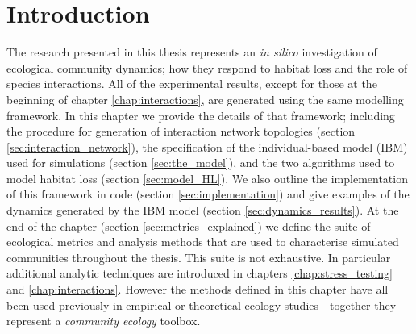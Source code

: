 

\section{Introduction}
\label{sec:methods_intro}
The research presented in this thesis represents an \emph{in silico} investigation of ecological community dynamics; how they respond to habitat loss and the role of species interactions. All of the experimental results, except for those at the beginning of chapter \ref{chap:interactions}, are generated using the same modelling framework. In this chapter we provide the details of that framework; including the procedure for generation of interaction network topologies (section \ref{sec:interaction_network}), the specification of the individual-based model (IBM) used for simulations (section \ref{sec:the_model}), and the two algorithms used to model habitat loss (section \ref{sec:model_HL}). We also outline the implementation of this framework in code (section \ref{sec:implementation}) and give examples of the dynamics generated by the IBM model (section \ref{sec:dynamics_results}). At the end of the chapter (section \ref{sec:metrics_explained}) we define the suite of ecological metrics and analysis methods that are used to characterise simulated communities throughout the thesis. This suite is not exhaustive. In particular additional analytic techniques are introduced in chapters \ref{chap:stress_testing} and \ref{chap:interactions}. However the methods defined in this chapter have all been used previously in empirical or theoretical ecology studies - together they represent a \emph{community ecology} toolbox. 




